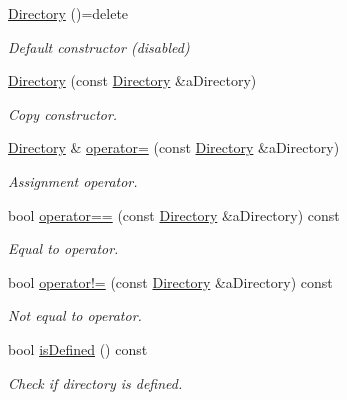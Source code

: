 \begin{DoxyCompactItemize}
\item 
\hyperlink{classlibrary_1_1core_1_1fs_1_1Directory_a3ec39f6cad19a81d520e9a1f2d8bb1f7}{Directory} ()=delete
\begin{DoxyCompactList}\small\item\em Default constructor (disabled) \end{DoxyCompactList}\item 
\hyperlink{classlibrary_1_1core_1_1fs_1_1Directory_a5685b48aa8a6332caf0e4e253d8471f7}{Directory} (const \hyperlink{classlibrary_1_1core_1_1fs_1_1Directory}{Directory} \&a\+Directory)
\begin{DoxyCompactList}\small\item\em Copy constructor. \end{DoxyCompactList}\item 
\hyperlink{classlibrary_1_1core_1_1fs_1_1Directory}{Directory} \& \hyperlink{classlibrary_1_1core_1_1fs_1_1Directory_ae49af93d5b45fd410634ab14d82a690a}{operator=} (const \hyperlink{classlibrary_1_1core_1_1fs_1_1Directory}{Directory} \&a\+Directory)
\begin{DoxyCompactList}\small\item\em Assignment operator. \end{DoxyCompactList}\item 
bool \hyperlink{classlibrary_1_1core_1_1fs_1_1Directory_a7d1a76c04ba3750606c3f22519d0ef66}{operator==} (const \hyperlink{classlibrary_1_1core_1_1fs_1_1Directory}{Directory} \&a\+Directory) const
\begin{DoxyCompactList}\small\item\em Equal to operator. \end{DoxyCompactList}\item 
bool \hyperlink{classlibrary_1_1core_1_1fs_1_1Directory_a5ecb69d28fb615ca5ee4f24ef74f1074}{operator!=} (const \hyperlink{classlibrary_1_1core_1_1fs_1_1Directory}{Directory} \&a\+Directory) const
\begin{DoxyCompactList}\small\item\em Not equal to operator. \end{DoxyCompactList}\item 
bool \hyperlink{classlibrary_1_1core_1_1fs_1_1Directory_a82654fb35d41e8cad43a50f4f609993f}{is\+Defined} () const
\begin{DoxyCompactList}\small\item\em Check if directory is defined. \end{DoxyCompactList}\item 

\end{DoxyCompactItemize}
